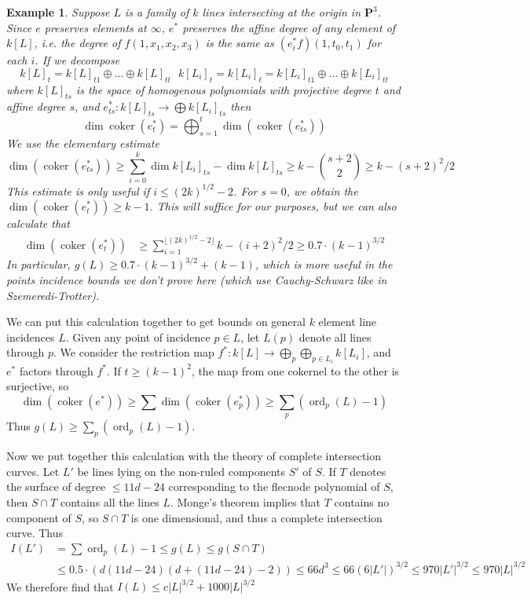 \documentclass{article}
\theoremstyle{plain}
\newtheorem*{example}{Example}
\DeclareMathOperator{\ord}{\text{ord}}
\DeclareMathOperator{\coker}{\text{coker}}
\begin{document}
\begin{example}
    Suppose $L$ is a family of $k$ lines intersecting at the origin in $\mathbf{P}^3$. Since $e$ preserves elements at $\infty$, $e^*$ preserves the affine degree of any element of $k[L]$, i.e. the degree of $f(1,x_1,x_2,x_3)$ is the same as $(e^*_i f)(1,t_0,t_1)$ for each $i$. If we decompose
    \[ k[L]_t = k[L]_{t1} \oplus \dots \oplus k[L]_{tt}\ \ \ k[L_i]_t = k[L_i]_t = k[L_i]_{t1} \oplus \dots \oplus k[L_i]_{tt} \]
    where $k[L]_{ts}$ is the space of homogenous polynomials with projective degree $t$ and affine degree $s$, and $e_{ts}^*: k[L]_{ts} \to \bigoplus k[L_i]_{ts}$ then
    \[ \dim \coker(e_t^*) = \bigoplus_{s = 1}^t \dim ( \coker(e_{ts}^*)) \]
    We use the elementary estimate
    \[ \dim ( \coker(e_{ts}^* )) \geq \sum_{i = 0}^k \dim k[L_i]_{ts} - \dim k[L]_{ts} \geq k -  {s+2 \choose 2} \geq k - (s+2)^2/2 \]
    This estimate is only useful if $i \leq (2k)^{1/2} - 2$. For $s = 0$, we obtain the $\dim(\coker(e_t^*)) \geq k-1$. This will suffice for our purposes, but we can also calculate that
    \begin{align*}
        \dim(\coker(e_t^*)) &\geq \sum_{i = 1}^{\lfloor (2k)^{1/2} - 2 \rfloor} k - (i+2)^2/2 \geq 0.7 \cdot (k-1)^{3/2}
    \end{align*}
    In particular, $g(L) \geq 0.7 \cdot (k-1)^{3/2} + (k-1)$, which is more useful in the points incidence bounds we don't prove here (which use Cauchy-Schwarz like in Szemeredi-Trotter).
\end{example}

We can put this calculation together to get bounds on general $k$ element line incidences $L$. Given any point of incidence $p \in L$, let $L(p)$ denote all lines through $p$. We consider the restriction map $f^*: k[L] \to \bigoplus_p \bigoplus_{p \in L_i} k[L_i]$, and $e^*$ factors through $f^*$. If $t \geq (k-1)^2$, the map from one cokernel to the other is surjective, so
%
\[ \dim(\coker(e^*)) \geq \sum \dim(\coker(e^*_p)) \geq \sum_p (\ord_p(L) - 1) \]
%
%
Thus $g(L) \geq \sum_p (\ord_p(L) - 1)$.

Now we put together this calculation with the theory of complete intersection curves. Let $L'$ be lines lying on the non-ruled components $S'$ of $S$. If $T$ denotes the surface of degree $\leq 11d - 24$ corresponding to the flecnode polynomial of $S$, then $S \cap T$ contains all the lines $L$. Monge's theorem implies that $T$ contains no component of $S$, so $S \cap T$ is one dimensional, and thus a complete intersection curve. Thus
%
\begin{align*}
    I(L') &= \sum \ord_p(L) - 1 \leq g(L) \leq g(S \cap T)\\
    &\leq 0.5 \cdot (d(11d - 24)(d + (11d - 24) - 2)) \leq 66d^3 \leq 66(6|L'|)^{3/2} \leq 970 |L'|^{3/2} \leq 970 |L|^{3/2}
\end{align*}
%
We therefore find that $I(L) \leq c |L|^{3/2} + 1000 |L|^{3/2}$
\end{document}
